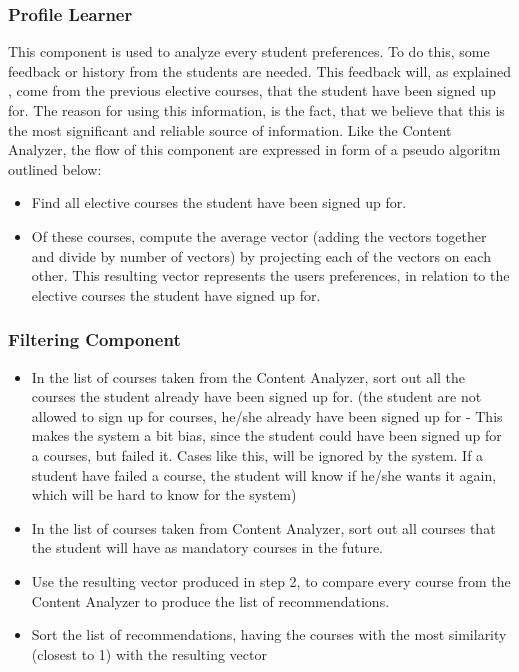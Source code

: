 \subsubsection{Profile Learner}
This component is used to analyze every student preferences. To do this, some feedback or history from the students are needed. This feedback will, as explained , come from the previous elective courses, that the student have been signed up for. The reason for using this information, is the fact, that we believe that this is the most significant and reliable source of information. Like the Content Analyzer, the flow of this component are expressed in form of a pseudo algoritm outlined below:
\begin{itemize}
	\item Find all elective courses the student have been signed up for. 
	\item Of these courses, compute the average vector (adding the vectors together and divide by number of vectors) by projecting each of the vectors on each other. This resulting vector represents the users preferences, in relation to the elective courses the student have signed up for. 
\end{itemize}

\subsubsection{Filtering Component}

\begin{itemize}
	\item In the list of courses taken from the Content Analyzer, sort out all the courses the student already have been signed up for. (the student are not allowed to sign up for courses, he/she already have been signed up for - This makes the system a bit bias, since the student could have been signed up for a courses, but failed it. Cases like this, will be ignored by the system. If a student have failed a course, the student will know if he/she wants it again, which will be hard to know for the system)
	\item In the list of courses taken from Content Analyzer, sort out all courses that the student will have as mandatory courses in the future.
	\item Use the resulting vector produced in step 2, to compare every course from the Content Analyzer to produce the list of recommendations.
	\item Sort the list of recommendations, having the courses with the most similarity (closest to 1) with the resulting vector 
\end{itemize}

